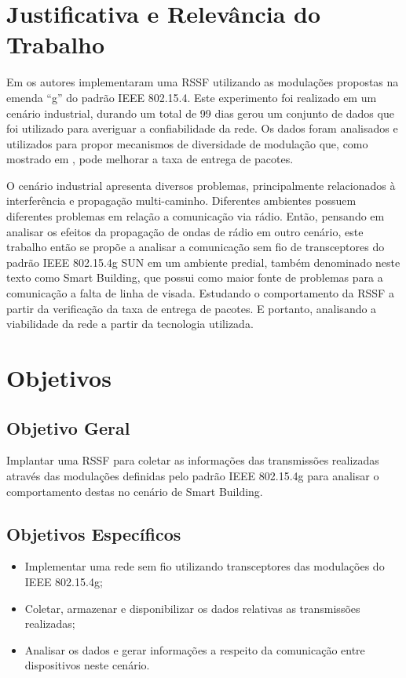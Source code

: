 \section{Justificativa e Relevância do Trabalho}
\label{sec:justificativa}
Em \cite{tuset2020dataset} os autores implementaram uma RSSF utilizando as modulações propostas na emenda ``g'' do padrão IEEE 802.15.4. Este experimento foi realizado em um cenário industrial, durando um total de 99 dias gerou um conjunto de dados que foi utilizado para averiguar a confiabilidade da rede. Os dados foram analisados e utilizados para propor mecanismos de diversidade de modulação que, como mostrado em \cite{gomes2020improving}, pode melhorar a taxa de entrega de pacotes.

O cenário industrial apresenta diversos problemas, principalmente relacionados à interferência e propagação multi-caminho. Diferentes ambientes possuem diferentes problemas em relação a comunicação via rádio. Então, pensando em analisar os efeitos da propagação de ondas de rádio em outro cenário, este trabalho então se propõe a analisar a comunicação sem fio de transceptores do padrão IEEE 802.15.4g SUN em um ambiente predial, também denominado neste texto como Smart Building, que possui como maior fonte de problemas para a comunicação a falta de linha de visada. Estudando o comportamento da RSSF a partir da verificação da taxa de entrega de pacotes. E portanto, analisando a viabilidade da rede a partir da tecnologia utilizada.

\section{Objetivos}
\label{sec:objetivos}

\subsection{Objetivo Geral}
\label{subsec:objGeral}
Implantar uma RSSF para coletar as informações das transmissões realizadas através das modulações definidas pelo padrão IEEE 802.15.4g para analisar o comportamento destas no cenário de Smart Building.


\subsection{Objetivos Específicos}
\label{subsec:objespecificos}
\begin{itemize}
    \item Implementar uma rede sem fio utilizando transceptores das modulações do IEEE 802.15.4g;
    \item Coletar, armazenar e disponibilizar os dados relativas as transmissões realizadas;
    \item Analisar os dados e gerar informações a respeito da comunicação entre dispositivos neste cenário.
\end{itemize}


